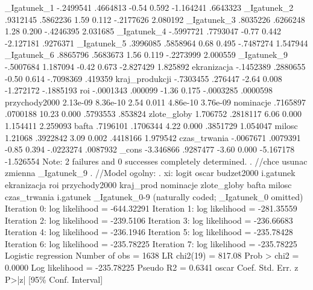 \begin{stlog}
   _Igatunek_1 {\VBAR}  -.2499541   .4664813    -0.54   0.592    -1.164241    .6643323
   _Igatunek_2 {\VBAR}   .9312145   .5862236     1.59   0.112    -.2177626    2.080192
   _Igatunek_3 {\VBAR}   .8035226   .6266248     1.28   0.200    -.4246395    2.031685
   _Igatunek_4 {\VBAR}  -.5997721   .7793047    -0.77   0.442    -2.127181    .9276371
   _Igatunek_5 {\VBAR}   .3996085   .5858964     0.68   0.495    -.7487274    1.547944
   _Igatunek_6 {\VBAR}   .8865796   .5683673     1.56   0.119    -.2273999    2.000559
   _Igatunek_9 {\VBAR}  -.5007684   1.187094    -0.42   0.673    -2.827429    1.825892
   ekranizacja {\VBAR}  -.1452389   .2880655    -0.50   0.614    -.7098369     .419359
kraj_produkcji {\VBAR}  -.7303455    .276447    -2.64   0.008    -1.272172   -.1885193
           roi {\VBAR}  -.0001343    .000099    -1.36   0.175    -.0003285    .0000598
 przychody2000 {\VBAR}   2.13e-09   8.36e-10     2.54   0.011     4.86e-10    3.76e-09
     nominacje {\VBAR}   .7165897   .0700188    10.23   0.000     .5793553     .853824
   zlote_globy {\VBAR}   1.706752   .2818117     6.06   0.000     1.154411    2.259093
         bafta {\VBAR}   .7196101   .1706344     4.22   0.000     .3851729    1.054047
        milosc {\VBAR}    1.21068   .3922842     3.09   0.002     .4418166    1.979542
  czas_trwania {\VBAR}  -.0067671   .0079391    -0.85   0.394    -.0223274    .0087932
         _cons {\VBAR}  -3.346866   .9287477    -3.60   0.000    -5.167178   -1.526554
Note: 2 failures and 0 successes completely determined.
{\smallskip}
. //chce usunac zmienna _Igatunek_9
. //Model ogolny:
. xi: logit oscar  budzet2000 i.gatunek ekranizacja roi przychody2000 kraj_prod nominacje zlote_globy
 bafta milosc czas_trwania
i.gatunek         _Igatunek_0-9       (naturally coded; _Igatunek_0 omitted)
{\smallskip}
Iteration 0:   log likelihood = -644.32291  
Iteration 1:   log likelihood = -281.35559  
Iteration 2:   log likelihood =  -239.5106  
Iteration 3:   log likelihood = -236.66683  
Iteration 4:   log likelihood =  -236.1946  
Iteration 5:   log likelihood = -235.78428  
Iteration 6:   log likelihood = -235.78225  
Iteration 7:   log likelihood = -235.78225  
{\smallskip}
Logistic regression                               Number of obs   =       1638
                                                  LR chi2(19)     =     817.08
                                                  Prob > chi2     =     0.0000
Log likelihood = -235.78225                       Pseudo R2       =     0.6341
{\smallskip}
         oscar {\VBAR}      Coef.   Std. Err.      z    P>|z|     [95\% Conf. Interval]

\end{stlog}
